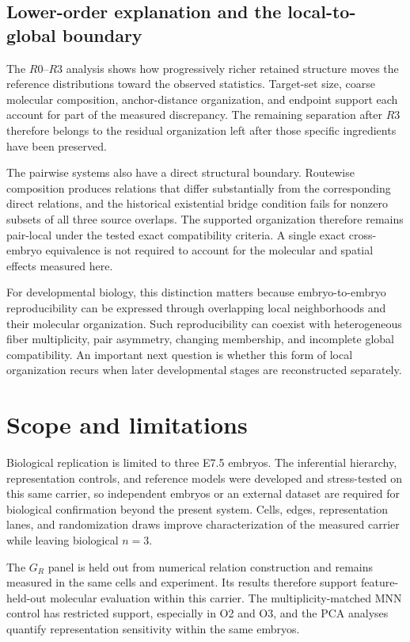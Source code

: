 \documentclass[11pt]{article}
\begin{document}
\subsection{Lower-order explanation and the local-to-global boundary}

The \(R0\)--\(R3\) analysis shows how progressively richer retained structure moves the reference distributions toward the observed statistics. Target-set size, coarse molecular composition, anchor-distance organization, and endpoint support each account for part of the measured discrepancy. The remaining separation after \(R3\) therefore belongs to the residual organization left after those specific ingredients have been preserved.

The pairwise systems also have a direct structural boundary. Routewise composition produces relations that differ substantially from the corresponding direct relations, and the historical existential bridge condition fails for nonzero subsets of all three source overlaps. The supported organization therefore remains pair-local under the tested exact compatibility criteria. A single exact cross-embryo equivalence is not required to account for the molecular and spatial effects measured here.

For developmental biology, this distinction matters because embryo-to-embryo reproducibility can be expressed through overlapping local neighborhoods and their molecular organization. Such reproducibility can coexist with heterogeneous fiber multiplicity, pair asymmetry, changing membership, and incomplete global compatibility. An important next question is whether this form of local organization recurs when later developmental stages are reconstructed separately.

\FloatBarrier
\section{Scope and limitations}

Biological replication is limited to three E7.5 embryos. The inferential hierarchy, representation controls, and reference models were developed and stress-tested on this same carrier, so independent embryos or an external dataset are required for biological confirmation beyond the present system. Cells, edges, representation lanes, and randomization draws improve characterization of the measured carrier while leaving biological \(n=3\).

The \(G_R\) panel is held out from numerical relation construction and remains measured in the same cells and experiment. Its results therefore support feature-held-out molecular evaluation within this carrier. The multiplicity-matched MNN control has restricted support, especially in O2 and O3, and the PCA analyses quantify representation sensitivity within the same embryos.
\end{document}
